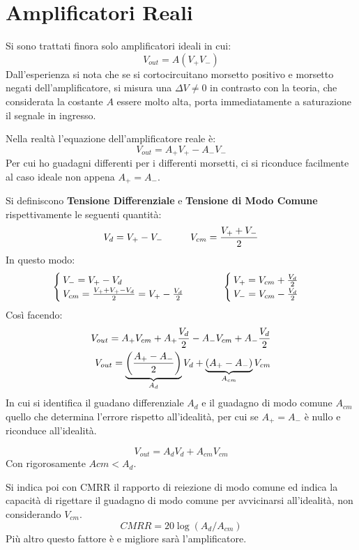 \documentclass[a4paper, 15pt]{article}
\begin{document}
\section{Amplificatori Reali}
\begin{adjustwidth}{2in}{}
   		Si sono trattati finora solo amplificatori ideali in cui:
   		\[V_{out} = A(V_+V_-)\]
   		Dall'esperienza si nota che se si cortocircuitano morsetto positivo e morsetto negati dell'amplificatore, si misura una $\Delta V\ne 0$ in contrasto con la teoria, che considerata la costante $A$ essere molto alta, porta immediatamente a saturazione il segnale in ingresso. \newline 
   		
   		Nella realtà l'equazione dell'amplificatore reale è:
   		\[V_{out} = A_+V_+ - A_-V_-\]
   		Per cui ho guadagni differenti per i differenti morsetti, ci si riconduce facilmente al caso ideale non appena \(A_+=A_-\). \newline 
   		
   		Si definiscono \textbf{Tensione Differenziale} e \textbf{Tensione di Modo Comune} rispettivamente le seguenti quantità:
   		\[V_d = V_+-V_- \hspace{1cm} V_{cm} = {V_++V_-\over2}\]
   		In questo modo: 
   		\[\begin{cases}
   			V_- = V_+ - V_d \\
   			V_{cm} = {V_+ + V_+ - V_d\over2} = V_+ - {V_d\over2}
   		\end{cases} \hspace{1cm} \begin{cases}
   		V_+ = V_{cm} + {V_d\over2} \\
   		V_- = V_{cm} - {V_d\over2}
   		\end{cases}\]
   		Così facendo:
   		\begin{eqnarray*}
   			V_{out} = A_+V_{cm} + A_+{V_d\over2} - A_-V_{cm} + A_-{V_d\over2} \\
   			V_{out} = \underbrace{ \left(A_+-A_-\over2\right)}_{A_d}V_d + \underbrace{\left(A_+-A_-\right)}_{A_{cm}}V_{cm}
   		\end{eqnarray*}
   		In cui si identifica il guadano differenziale $A_d$ e il guadagno di modo comune $A_{cm}$ quello che determina l'errore rispetto all'idealità, per cui se $A_+=A_-$ è nullo e riconduce all'idealità. \newline 
   		
   		\[V_{out} = A_dV_d + A_{cm}V_{cm}\]
   		Con rigorosamente $A{cm}<A_d$. 
   		
   		Si indica poi con CMRR il rapporto di reiezione di modo comune ed indica la capacità di rigettare il guadagno di modo comune per avvicinarsi all'idealità, non considerando $V_{cm}$. 
   		\[CMRR = 20\log\left(A_d/A_{cm}\right)\] 
   		Più altro questo fattore è e migliore sarà l'amplificatore. 
\end{adjustwidth}
\end{document}
